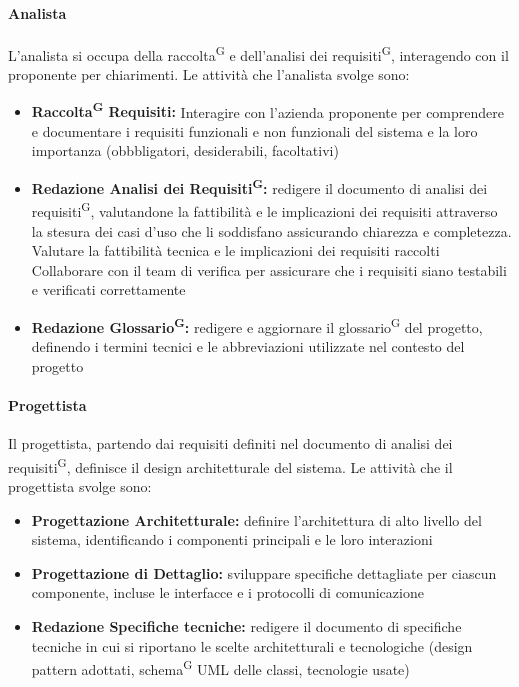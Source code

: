 \documentclass[a4paper, 11pt]{article}
\begin{document}
\paragraph{Analista} 
    L'analista si occupa della raccolta\textsuperscript{G} e dell'analisi dei requisiti\textsuperscript{G}, interagendo con il proponente per chiarimenti.
    Le attività che l'analista svolge sono:
    \begin{itemize}
        \item \textbf{Raccolta\textsuperscript{G} Requisiti:} Interagire con l'azienda proponente per comprendere e documentare i requisiti funzionali e non funzionali del sistema e la loro importanza (obbbligatori, desiderabili, facoltativi)
        \item \textbf{Redazione Analisi dei Requisiti\textsuperscript{G}:} redigere il documento di analisi dei requisiti\textsuperscript{G}, valutandone la fattibilità e le implicazioni dei requisiti attraverso la stesura dei casi d'uso che li soddisfano
         assicurando chiarezza e completezza. Valutare la fattibilità tecnica e le implicazioni dei requisiti raccolti Collaborare con il team di verifica per assicurare che i requisiti siano testabili e verificati correttamente
        \item \textbf{Redazione Glossario\textsuperscript{G}:} redigere e aggiornare il glossario\textsuperscript{G} del progetto, definendo i termini tecnici e le abbreviazioni utilizzate nel contesto del progetto
    \end{itemize}
\paragraph{Progettista}
Il progettista, partendo dai requisiti definiti nel documento di analisi dei requisiti\textsuperscript{G}, definisce il design architetturale del sistema.
    Le attività che il progettista svolge sono:
    \begin{itemize}
        \item \textbf{Progettazione Architetturale:} definire l'architettura di alto livello del sistema, identificando i componenti principali e le loro interazioni
        \item \textbf{Progettazione di Dettaglio:} sviluppare specifiche dettagliate per ciascun componente, incluse le interfacce e i protocolli di comunicazione
        \item \textbf{Redazione Specifiche tecniche:} redigere il documento di specifiche tecniche in cui si riportano le scelte architetturali e tecnologiche (design pattern adottati, schema\textsuperscript{G} UML delle classi, tecnologie usate)
    \end{itemize}
\end{document}
